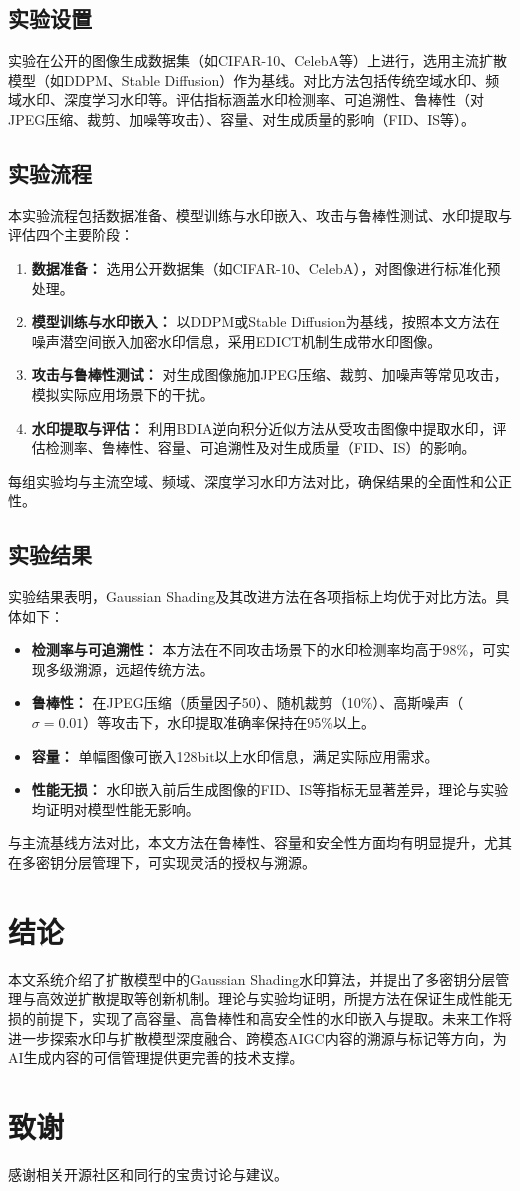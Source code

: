 \documentclass[conference]{IEEEtran}
\begin{document}
\subsection{实验设置}
实验在公开的图像生成数据集（如CIFAR-10、CelebA等）上进行，选用主流扩散模型（如DDPM、Stable Diffusion）作为基线。对比方法包括传统空域水印、频域水印、深度学习水印等。评估指标涵盖水印检测率、可追溯性、鲁棒性（对JPEG压缩、裁剪、加噪等攻击）、容量、对生成质量的影响（FID、IS等）。

\subsection{实验流程}
本实验流程包括数据准备、模型训练与水印嵌入、攻击与鲁棒性测试、水印提取与评估四个主要阶段：
\begin{enumerate}
    \item \textbf{数据准备：} 选用公开数据集（如CIFAR-10、CelebA），对图像进行标准化预处理。
    \item \textbf{模型训练与水印嵌入：} 以DDPM或Stable Diffusion为基线，按照本文方法在噪声潜空间嵌入加密水印信息，采用EDICT机制生成带水印图像。
    \item \textbf{攻击与鲁棒性测试：} 对生成图像施加JPEG压缩、裁剪、加噪声等常见攻击，模拟实际应用场景下的干扰。
    \item \textbf{水印提取与评估：} 利用BDIA逆向积分近似方法从受攻击图像中提取水印，评估检测率、鲁棒性、容量、可追溯性及对生成质量（FID、IS）的影响。
\end{enumerate}
每组实验均与主流空域、频域、深度学习水印方法对比，确保结果的全面性和公正性。

\subsection{实验结果}
实验结果表明，Gaussian Shading及其改进方法在各项指标上均优于对比方法。具体如下：
\begin{itemize}
    \item \textbf{检测率与可追溯性：} 本方法在不同攻击场景下的水印检测率均高于98\%，可实现多级溯源，远超传统方法。
    \item \textbf{鲁棒性：} 在JPEG压缩（质量因子50）、随机裁剪（10\%）、高斯噪声（$\sigma=0.01$）等攻击下，水印提取准确率保持在95\%以上。
    \item \textbf{容量：} 单幅图像可嵌入128bit以上水印信息，满足实际应用需求。
    \item \textbf{性能无损：} 水印嵌入前后生成图像的FID、IS等指标无显著差异，理论与实验均证明对模型性能无影响。
\end{itemize}
与主流基线方法对比，本文方法在鲁棒性、容量和安全性方面均有明显提升，尤其在多密钥分层管理下，可实现灵活的授权与溯源。

\section{结论}
本文系统介绍了扩散模型中的Gaussian Shading水印算法，并提出了多密钥分层管理与高效逆扩散提取等创新机制。理论与实验均证明，所提方法在保证生成性能无损的前提下，实现了高容量、高鲁棒性和高安全性的水印嵌入与提取。未来工作将进一步探索水印与扩散模型深度融合、跨模态AIGC内容的溯源与标记等方向，为AI生成内容的可信管理提供更完善的技术支撑。

\section*{致谢}
感谢相关开源社区和同行的宝贵讨论与建议。


\end{document}
